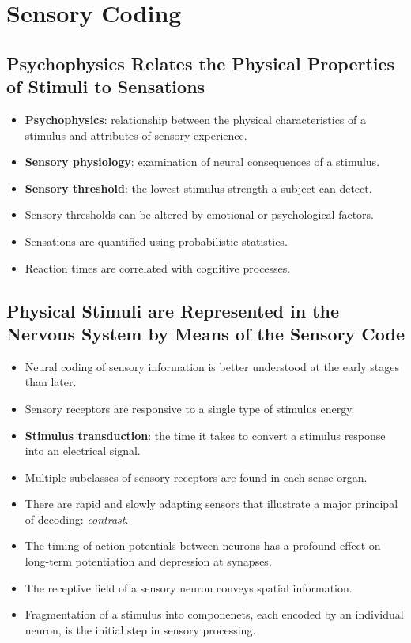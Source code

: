 \documentclass[12pt,a4paper]{article}
\begin{document}
\clearpage
{}

\clearpage
\section{Sensory Coding}
\subsection{Psychophysics Relates the Physical Properties of Stimuli to Sensations}
\begin{itemize}
    \item \textbf{Psychophysics}: relationship between the physical characteristics of a stimulus and attributes of sensory experience.
    \item \textbf{Sensory physiology}: examination of neural consequences of a stimulus.
    \item \textbf{Sensory threshold}: the lowest stimulus strength a subject can detect.
    \item Sensory thresholds can be altered by emotional or psychological factors.
    \item Sensations are quantified using probabilistic statistics.
    \item Reaction times are correlated with cognitive processes.
\end{itemize}

\subsection{Physical Stimuli are Represented in the Nervous System by Means of the Sensory Code}
\begin{itemize}
    \item Neural coding of sensory information is better understood at the early stages than later.
    \item Sensory receptors are responsive to a single type of stimulus energy.
    \item \textbf{Stimulus transduction}: the time it takes to convert a stimulus response into an electrical signal.
    \item Multiple subclasses of sensory receptors are found in each sense organ.
    \item There are rapid and slowly adapting sensors that illustrate a major principal of decoding: \textit{contrast}.
    \item  The timing of action potentials between neurons has a profound effect on long-term potentiation and depression at synapses.
    \item The receptive field of a sensory neuron conveys spatial information.
    \item Fragmentation of a stimulus into componenets, each encoded by an individual neuron, is the initial step in sensory processing.
\end{itemize}
\end{document}
